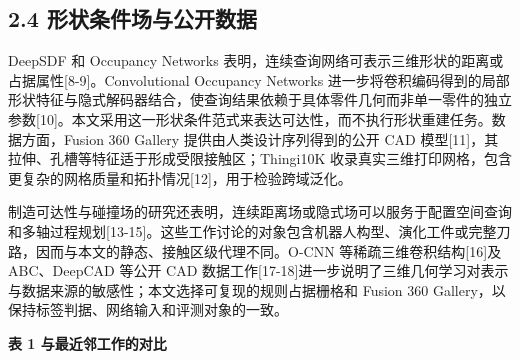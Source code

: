 \subsection{2.4 形状条件场与公开数据}\label{ux5f62ux72b6ux6761ux4ef6ux573aux4e0eux516cux5f00ux6570ux636e}

DeepSDF 和 Occupancy Networks 表明，连续查询网络可表示三维形状的距离或占据属性{[}8-9{]}。Convolutional Occupancy Networks 进一步将卷积编码得到的局部形状特征与隐式解码器结合，使查询结果依赖于具体零件几何而非单一零件的独立参数{[}10{]}。本文采用这一形状条件范式来表达可达性，而不执行形状重建任务。数据方面，Fusion 360 Gallery 提供由人类设计序列得到的公开 CAD 模型{[}11{]}，其拉伸、孔槽等特征适于形成受限接触区；Thingi10K 收录真实三维打印网格，包含更复杂的网格质量和拓扑情况{[}12{]}，用于检验跨域泛化。

制造可达性与碰撞场的研究还表明，连续距离场或隐式场可以服务于配置空间查询和多轴过程规划{[}13-15{]}。这些工作讨论的对象包含机器人构型、演化工件或完整刀路，因而与本文的静态、接触区级代理不同。O-CNN 等稀疏三维卷积结构{[}16{]}及 ABC、DeepCAD 等公开 CAD 数据工作{[}17-18{]}进一步说明了三维几何学习对表示与数据来源的敏感性；本文选择可复现的规则占据栅格和 Fusion 360 Gallery，以保持标签判据、网络输入和评测对象的一致。

\textbf{表 1 与最近邻工作的对比}

